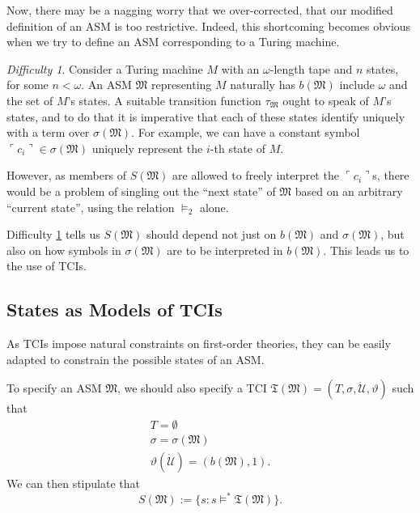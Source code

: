 \documentclass[12pt, twoside]{memoir}
\numberwithin{equation}{section}
\theoremstyle{definition}
\theoremstyle{remark}
\newtheorem{diff}[thm]{Difficulty}
\theoremstyle{definition}
\theoremstyle{definition}
\theoremstyle{definition}
\theoremstyle{remark}
\begin{document}
Now, there may be a nagging worry that we over-corrected, that our modified definition of an ASM is too restrictive. Indeed, this shortcoming becomes obvious when we try to define an ASM corresponding to a Turing machine.

\begin{diff}\label{diff29}
Consider a Turing machine $M$ with an $\omega$-length tape and $n$ states, for some $n < \omega$. An ASM $\mathfrak{M}$ representing $M$ naturally has $b(\mathfrak{M})$ include $\omega$ and the set of $M$'s states. A suitable transition function $\tau_{\mathfrak{M}}$ ought to speak of $M$'s states, and to do that it is imperative that each of these states identify uniquely with a term over $\sigma(\mathfrak{M})$. For example, we can have a constant symbol $\ulcorner c_i \urcorner \in \sigma(\mathfrak{M})$ uniquely represent the $i$-th state of $M$. 

However, as members of $S(\mathfrak{M})$ are allowed to freely interpret the $\ulcorner c_i \urcorner$s, there would be a problem of singling out the ``next state'' of $\mathfrak{M}$ based on an arbitrary ``current state'', using the relation $\models_2$ alone.
\end{diff}

Difficulty \ref{diff29} tells us $S(\mathfrak{M})$ should depend not just on $b(\mathfrak{M})$ and $\sigma(\mathfrak{M})$, but also on how symbols in $\sigma(\mathfrak{M})$ are to be interpreted in $b(\mathfrak{M})$. This leads us to the use of TCIs.

\subsection{States as Models of TCIs}\label{ssect23}

As TCIs impose natural constraints on first-order theories, they can be easily adapted to constrain the possible states of an ASM. 

To specify an ASM $\mathfrak{M}$, we should also specify a TCI $\mathfrak{T}(\mathfrak{M}) = (T, \sigma, \dot{\mathcal{U}}, \vartheta)$ such that 
\begin{gather*}
    T = \emptyset \\
    \sigma = \sigma(\mathfrak{M}) \\
    \vartheta(\dot{\mathcal{U}}) = (b(\mathfrak{M}), 1).
\end{gather*}
We can then stipulate that 
\begin{equation*}
    S(\mathfrak{M}) := \{s : s \models^* \mathfrak{T}(\mathfrak{M})\} \text{.}
\end{equation*}
\end{document}
